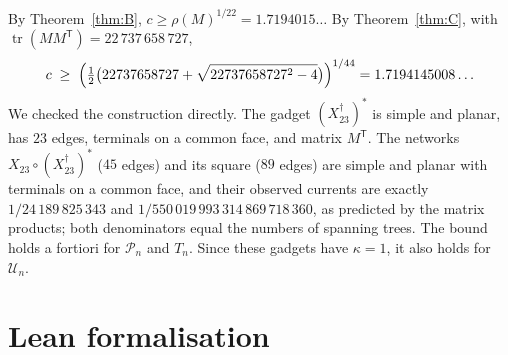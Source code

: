 \documentclass[11pt]{amsart}
\theoremstyle{plain}
\theoremstyle{definition}
\theoremstyle{remark}
\newcommand{\T}{\mathsf{T}}
\begin{document}
By Theorem~\ref{thm:B}, $c\ge\rho(M)^{1/22}=1.7194015\ldots$ By Theorem~\ref{thm:C}, with
$\operatorname{tr}(MM^{\T})=22\,737\,658\,727$,
\[
c\;\ge\;\Bigl(\tfrac12\bigl(22737658727+\sqrt{22737658727^2-4}\bigr)\Bigr)^{1/44}=1.7194145008\ldots
\]
We checked the construction directly. The gadget $(X_{23}^\dagger)^\ast$ is simple and planar, has $23$ edges,
terminals on a common face, and matrix $M^{\T}$. The networks $X_{23}\circ(X_{23}^\dagger)^\ast$ ($45$ edges) and
its square ($89$ edges) are simple and planar with terminals on a common face, and their observed currents are
exactly $1/24\,189\,825\,343$ and $1/550\,019\,993\,314\,869\,718\,360$, as predicted by the matrix products;
both denominators equal the numbers of spanning trees. The bound holds a fortiori for $\mathcal P_n$ and $T_n$.
Since these gadgets have $\kappa=1$, it also holds for $\mathcal U_n$.

\section{Lean formalisation}\label{sec:lean}
\end{document}
